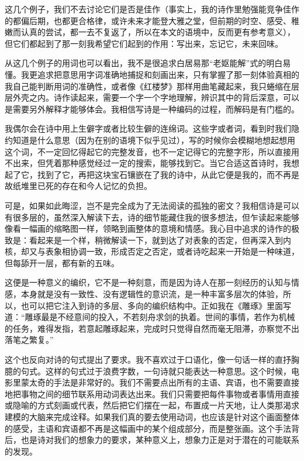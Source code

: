 \documentclass{article}
\begin{document}
这几个例子，我们不去讨论它们是否是佳作（事实上，我的诗作里勉强能竞争佳作的都偏后期，也都更合格律，或许未来才能登大雅之堂，但前期的时空、感受、稚嫩而认真的尝试，都一去不复返了，所以在本文的语境中，反而更有参考意义），但它们都起到了那一刻我希望它们起到的作用：写出来，忘记它，未来回味。

从这几个例子的用词也可以看出，我不是很追求白居易那``老妪能解''式的明白易懂。我更追求把意思用字词准确地捕捉和刻画出来，只有掌握了那一刻体验真相的我自己能判断用词的准确性，或者像《红楼梦》那样用曲笔藏起来，我只蜷缩在层层外壳之内。诗作读起来，需要一个字一个字地理解，辨识其中的背后深意，可以是需要另外解释才能够体会。我相信写诗是一种编码的过程，而解码是有门槛的。

我偶尔会在诗中用上生僻字或者比较生僻的连绵词。这些字或者词，看到时我们隐约知道是什么意思（因为在别的语境下似乎见过），写的时候你会模糊地想起想用这个词，不一定回忆得起它的完整发音，也不一定记得它的完整字形，所以直接用不出来，但凭着那种感觉经过一定的搜索，能够找到它。当它合适这首诗时，我想起了它，找到了它，再把这块宝石镶嵌在了我的诗中，从此它便是我的，而不再是故纸堆里已死的存在和今人记忆的负担。

可是，如果如此晦涩，岂不是完全成为了无法阅读的孤独的密文？我相信诗是可以有很多层的，虽然深入解读下去，诗的细节能藏住我的很多想法，但乍读起来能够像看一幅画的缩略图一样，领略到画整体的意境和情感。我心目中追求的诗作的极致是：看起来是一个样，稍微解读一下，就到达了对表象的否定，但再深入到内核，却又与表象相协调一致，形成否定之否定，或者诗吃起来一开始是一种味道，但每舔开一层，都有新的五味。

这便是一种意义的编织，它不是一种刻意，而是因为诗人在那一刻经历的认知与情感，本身就是没有一致性、没有逻辑性的意识流，是一种丰富多层次的体验，所以，也可以把它注入到诗的多层、多向的编织结构中。正如我在《雕琢》里面写道：``雕琢最是不经意间的投入，不若刻舟求剑的执着。世间的事情，若作为机械的任务，难得发指，若意起雕琢起来，完成时只觉得自然而毫无阻滞，亦察觉不出落笔之繁复。''

这个也反向对诗的句式提出了要求。我不喜欢过于口语化，像一句话一样的直抒胸臆的句式。这样的句式过于浪费字数，一句诗就只能表达一种意思。这个时候，电影里蒙太奇的手法是非常好的。我们不需要点出所有的主语、宾语，也不需要直接地把事物之间的细节联系用动词表达出来。我们只需要把每件事物或者事情用直接或隐喻的方式刻画或代表，然后把它们摆在一起，布置成一片天地，让人类那渴求建模的大脑来完成诠释。如果我们真的要去使用动词，也应该是针对这个画面整体的感受，主语和宾语都不再是这幅画中的某个组成部分，而是整张画。这个手法背后，也是诗对我们的想象力的要求，某种意义上，想象力正是对于潜在的可能联系的发现。
\end{document}
